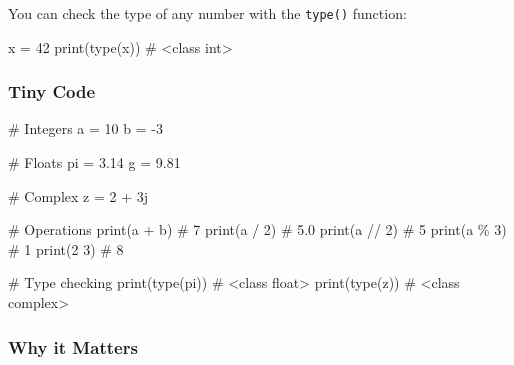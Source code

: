 \documentclass[
  letterpaper,
  DIV=11,
  numbers=noendperiod]{scrreprt}
\newenvironment{Shaded}{\begin{snugshade}}{\end{snugshade}}
\newcommand{\BuiltInTok}[1]{\textcolor[rgb]{0.00,0.23,0.31}{#1}}
\newcommand{\CommentTok}[1]{\textcolor[rgb]{0.37,0.37,0.37}{#1}}
\newcommand{\DecValTok}[1]{\textcolor[rgb]{0.68,0.00,0.00}{#1}}
\newcommand{\FloatTok}[1]{\textcolor[rgb]{0.68,0.00,0.00}{#1}}
\newcommand{\NormalTok}[1]{\textcolor[rgb]{0.00,0.23,0.31}{#1}}
\newcommand{\OperatorTok}[1]{\textcolor[rgb]{0.37,0.37,0.37}{#1}}
\newcommand{\OtherTok}[1]{\textcolor[rgb]{0.00,0.23,0.31}{#1}}
\begin{document}
You can check the type of any number with the \texttt{type()} function:

\begin{Shaded}
\begin{Highlighting}[]
\NormalTok{x }\OperatorTok{=} \DecValTok{42}
\BuiltInTok{print}\NormalTok{(}\BuiltInTok{type}\NormalTok{(x))  }\CommentTok{\# \textless{}class \textquotesingle{}int\textquotesingle{}\textgreater{}}
\end{Highlighting}
\end{Shaded}

\subsubsection{Tiny Code}\label{tiny-code-6}

\begin{Shaded}
\begin{Highlighting}[]
\CommentTok{\# Integers}
\NormalTok{a }\OperatorTok{=} \DecValTok{10}
\NormalTok{b }\OperatorTok{=} \OperatorTok{{-}}\DecValTok{3}

\CommentTok{\# Floats}
\NormalTok{pi }\OperatorTok{=} \FloatTok{3.14}
\NormalTok{g }\OperatorTok{=} \FloatTok{9.81}

\CommentTok{\# Complex}
\NormalTok{z }\OperatorTok{=} \DecValTok{2} \OperatorTok{+} \OtherTok{3j}

\CommentTok{\# Operations}
\BuiltInTok{print}\NormalTok{(a }\OperatorTok{+}\NormalTok{ b)    }\CommentTok{\# 7}
\BuiltInTok{print}\NormalTok{(a }\OperatorTok{/} \DecValTok{2}\NormalTok{)    }\CommentTok{\# 5.0}
\BuiltInTok{print}\NormalTok{(a }\OperatorTok{//} \DecValTok{2}\NormalTok{)   }\CommentTok{\# 5}
\BuiltInTok{print}\NormalTok{(a }\OperatorTok{\%} \DecValTok{3}\NormalTok{)    }\CommentTok{\# 1}
\BuiltInTok{print}\NormalTok{(}\DecValTok{2}  \DecValTok{3}\NormalTok{)   }\CommentTok{\# 8}

\CommentTok{\# Type checking}
\BuiltInTok{print}\NormalTok{(}\BuiltInTok{type}\NormalTok{(pi)) }\CommentTok{\# \textless{}class \textquotesingle{}float\textquotesingle{}\textgreater{}}
\BuiltInTok{print}\NormalTok{(}\BuiltInTok{type}\NormalTok{(z))  }\CommentTok{\# \textless{}class \textquotesingle{}complex\textquotesingle{}\textgreater{}}
\end{Highlighting}
\end{Shaded}

\subsubsection{Why it Matters}\label{why-it-matters-6}
\end{document}
